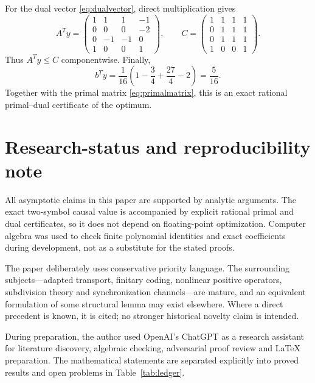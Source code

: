 \documentclass[11pt,a4paper]{article}
\theoremstyle{definition}
\theoremstyle{remark}
\begin{document}
For the dual vector \eqref{eq:dualvector}, direct multiplication gives
\[
 A^Ty=\begin{pmatrix}
1&1&1&-1\\0&0&0&-2\\0&-1&-1&0\\1&0&0&1
\end{pmatrix},
\qquad
 C=\begin{pmatrix}
1&1&1&1\\0&1&1&1\\0&1&1&1\\1&0&0&1
\end{pmatrix}.
\]
Thus \(A^Ty\le C\) componentwise.  Finally,
\[
 b^Ty=\frac1{16}\left(1-\frac34+\frac{27}{4}-2\right)=\frac5{16}.
\]
Together with the primal matrix \eqref{eq:primalmatrix}, this is an exact
rational primal--dual certificate of the optimum.

\section*{Research-status and reproducibility note}

All asymptotic claims in this paper are supported by analytic arguments.
The exact two-symbol causal value is accompanied by explicit rational primal
and dual certificates, so it does not depend on floating-point optimization.
Computer algebra was used to check finite polynomial identities and exact
coefficients during development, not as a substitute for the stated proofs.

The paper deliberately uses conservative priority language.  The surrounding
subjects---adapted transport, finitary coding, nonlinear positive operators,
subdivision theory and synchronization channels---are mature, and an
equivalent formulation of some structural lemma may exist elsewhere.  Where a
direct precedent is known, it is cited; no stronger historical novelty claim
is intended.

During preparation, the author used OpenAI's ChatGPT as a research assistant
for literature discovery, algebraic checking, adversarial proof review and
\LaTeX{} preparation.  The mathematical statements are separated explicitly
into proved results and open problems in Table~\ref{tab:ledger}.
\end{document}
